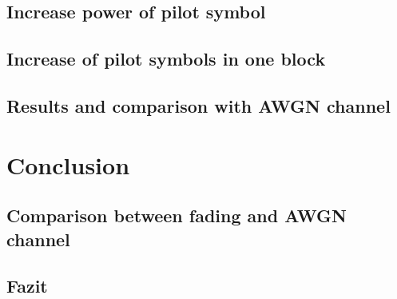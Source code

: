 \documentclass[12pt,oneside, draft]{report}
\begin{document}
\section{Increase power of pilot symbol}

\section{Increase of pilot symbols in one block}


\section{Results and comparison with AWGN channel}


\chapter{Conclusion}

\section{Comparison between fading and AWGN channel}

\section{Fazit}


%
\end{document}

